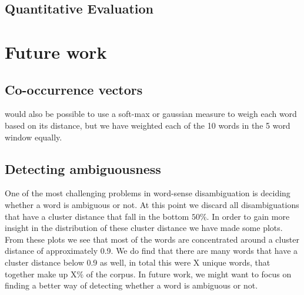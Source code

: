 \documentclass[11pt]{article}
\begin{document}


\subsection{Quantitative Evaluation}
\section{Future work}
\subsection{Co-occurrence vectors}
would also be possible to use a soft-max or gaussian measure to weigh each word based on its distance, but we have weighted each of the 10 words in the 5 word window equally.
\subsection{Detecting ambiguousness}
One of the most challenging problems in word-sense disambiguation is deciding whether a word is ambiguous or not. At this point we discard all disambiguations that have a cluster distance that fall in the bottom $50\%$. In order to gain more insight in the distribution of these cluster distance we have made some plots. From these plots we see that most of the words are concentrated around a cluster distance of approximately 0.9. We do find that there are many words that have a cluster distance below 0.9 as well, in total this were X unique words, that together make up X$\%$ of the corpus. In future work, we might want to focus on finding a better way of detecting whether a word is ambiguous or not. 
\end{document}
